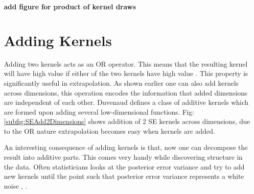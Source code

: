 \begin{figure}[!ht]
  \centering
    \quad
{}\quad

       \caption{}
       \label{figPrior}
\end{figure}
\textbf{add figure for product of kernel draws}


\section{Adding Kernels} \label{subsec:structureKernelsAddingKernels}
Adding two kernels acts as an OR operator. This means that the resulting kernel will have high value if either of the two kernels have high value \cite{durrande2011additive}. This property is significantly useful in extrapolation. As shown earlier one can also add kernels across dimensions, this operation encodes the information that added dimensions are independent of each other. Duvenaud \cite{duvenaud2011additive} defines a class of additive kernels which are formed upon adding several low-dimensional functions. Fig: \ref{subfig:SEAdd2Dimensions} shows addition of 2 SE kernels across dimensions, due to the OR nature extrapolation becomes easy when kernels are added.

An interesting consequence of adding kernels is that, now one can decompose the result into additive parts. This comes very handy while discovering structure in the data. Often statisticians  looks at the posterior error variance and try to add new kernels until the point such that posterior error variance represents a white noise \cite{duvenaud2013structure}, \cite{lloyd2014automatic}. 

